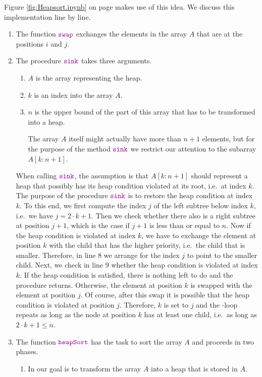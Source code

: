 Figure \ref{fig:Heapsort.ipynb} on page \pageref{fig:Heapsort.ipynb} makes use of this idea.
We discuss this implementation line by line.
\begin{enumerate}
\item The function $\mytt{swap}$ exchanges the elements in the array ${A}$ that are at the
      positions $i$ and $j$.
\item The procedure $\mytt{sink}$ takes three arguments.
      \begin{enumerate}
      \item ${A}$ is the array representing the heap.
      \item ${k}$ is an index into the array ${A}$.
      \item ${n}$ is the upper bound  of the part of this array that has to be transformed into a heap.  

            The array ${A}$ itself might actually have more than $n+1$ elements, but for the
            purpose of the method $\mytt{sink}$ we restrict our attention to the subarray
            ${A[k:n+1]}$. 
      \end{enumerate}
      When calling $\mytt{sink}$, the assumption is that $A[{k:n+1}]$ should represent a heap 
      that possibly has its heap condition violated at its root, i.e.~at index ${k}$.  The
      purpose of the procedure $\mytt{sink}$ is to restore the heap condition at index ${k}$.
      To this end, we first compute the index ${j}$ of the left subtree below index ${k}$,
      i.e.~we have $j = 2 \cdot k + 1$.
      Then we check whether there also is a right subtree at position ${j}+1$, which is the
      case if $j + 1$ is less than or equal to  ${n}$.  Now if the heap condition is violated at index
      ${k}$, we have to exchange the element at  position ${k}$ with the child that has
      the higher priority, i.e.~the child that is smaller. Therefore, in line 8 we arrange for the index
      ${j}$ to point to the smaller child.  Next, we check in line 9 whether the heap
      condition is violated at index ${k}$.  If the heap condition is satisfied, there is
      nothing left to do and the procedure returns.  Otherwise, the element at position ${k}$ is swapped with
      the element at position ${j}$.  Of course, after this swap it is possible that the heap condition is
      violated at position ${j}$.  Therefore,  ${k}$ is set to ${j}$ and the -loop repeats
      as long as the node at position ${k}$ has at least one child, i.e.~as long as 
      $2 \cdot {k} + 1 \leq {n}$.
\item The function $\mytt{heapSort}$ has the task to sort the array ${A}$ and proceeds in two phases.
      \begin{enumerate}
      \item In  our goal is to transform the array ${A}$ into a heap that is stored in ${A}$.


\end{enumerate}
\end{enumerate}
